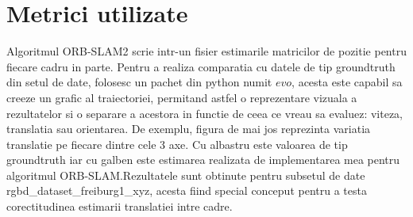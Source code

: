 \documentclass[12pt,a4paper]{report}
\begin{document}
\section{Metrici utilizate}
Algoritmul ORB-SLAM2 scrie intr-un fisier estimarile matricilor de pozitie pentru fiecare 
cadru in parte. Pentru a realiza comparatia cu datele de tip groundtruth din setul de 
date, folosesc un pachet din python numit $ evo $, acesta este capabil sa creeze un grafic
al traiectoriei, permitand astfel o reprezentare vizuala a rezultatelor si o separare a 
acestora in functie de ceea ce vreau sa evaluez: viteza, translatia sau orientarea. De
exemplu, figura de mai jos reprezinta variatia translatie pe fiecare dintre cele 3 axe. 
Cu albastru este valoarea de tip groundtruth iar cu galben este estimarea realizata de 
implementarea mea pentru algoritmul ORB-SLAM.\@ Rezultatele sunt obtinute pentru subsetul 
de date rgbd\_dataset\_freiburg1\_xyz, acesta fiind special conceput pentru a testa 
corectitudinea estimarii translatiei intre cadre.
\end{document}

